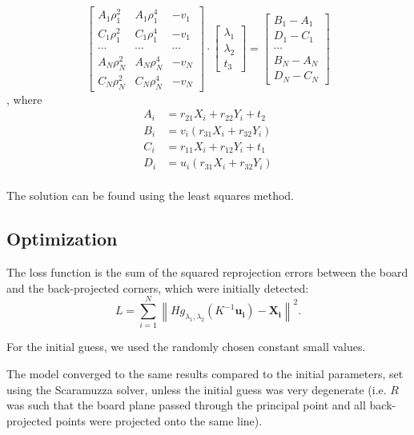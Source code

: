 \begin{equation}
	\begin{bmatrix}
		A_1 \rho_1^{2} & A_1 \rho_1^{4} & -v_1   \\
		C_1 \rho_1^{2} & C_1 \rho_1^{4} & -v_1   \\
		\cdots         & \cdots         & \cdots \\
		A_N \rho_N^{2} & A_N \rho_N^{4} & -v_N   \\
		C_N \rho_N^{2} & C_N \rho_N^{4} & -v_N
	\end{bmatrix} \cdot \begin{bmatrix}
		\lambda_1 \\
		\lambda_2 \\
		t_3
	\end{bmatrix} = \begin{bmatrix}
		B_1 - A_1 \\
		D_1 - C_1 \\
		\cdots    \\
		B_N - A_N \\
		D_N - C_N
	\end{bmatrix}
\end{equation},
where
\begin{align}
	A_i & = r_{21} X_i + r_{22} Y_i + t_2 \\
	B_i & = v_i (r_{31} X_i + r_{32} Y_i) \\
	C_i & = r_{11} X_i + r_{12} Y_i + t_1 \\
	D_i & = u_i (r_{31} X_i + r_{32} Y_i) \\
\end{align}

The solution can be found using the least squares method.

\subsection{Optimization}\label{sub:optimization}

The loss function is the sum of the squared reprojection errors between the board and
the back-projected corners, which were initially detected:
\begin{equation}
	L = \sum_{i=1}^{N} \left\lVert
	H g_{\lambda_1, \lambda_2}(K^{-1} \mathbf{u_i}) -
	\mathbf{X_i} \right\rVert^2.
\end{equation}

For the initial guess, we used the randomly chosen constant small values.

The model converged to the same results compared to the initial parameters, set
using the Scaramuzza solver, unless the initial guess was very degenerate (i.e.
\(R\) was such that the board plane passed through the principal point and all
back-projected points were projected onto the same line).

